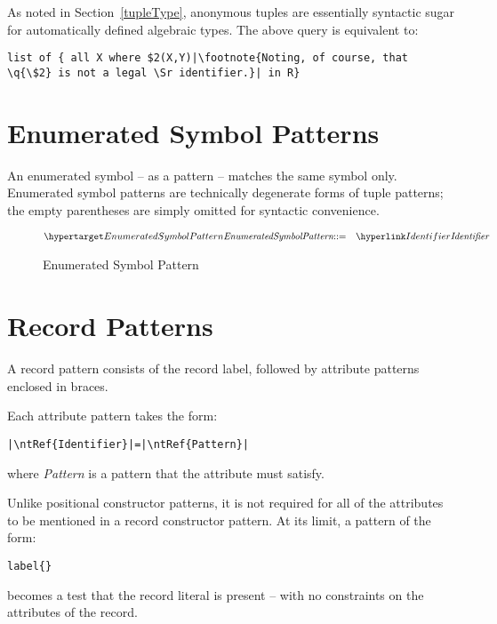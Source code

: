 \begin{aside}
As noted in Section~\vref{tupleType}, anonymous tuples are essentially syntactic sugar for automatically defined algebraic types. The above query is equivalent to:
\begin{lstlisting}[escapechar=|]
list of { all X where $2(X,Y)|\footnote{Noting, of course, that \q{\$2} is not a legal \Sr identifier.}| in R}
\end{lstlisting}

\end{aside}

\section{Enumerated Symbol Patterns}
\label{enumPattern}

An enumerated symbol -- as a pattern -- matches the same symbol only. Enumerated symbol patterns are technically degenerate forms of tuple patterns; the empty parentheses are simply omitted for syntactic convenience.

\begin{figure}[htbp]
\begin{eqnarray*}
\ntDef{EnumeratedSymbolPattern}&\arrow&\ntRef{Identifier}
\end{eqnarray*}
\caption{Enumerated Symbol Pattern}
\label{enumSumbolPtn}
\end{figure}

\section{Record Patterns}
\label{aggregateConPattern}
A record pattern consists of the record label, followed by attribute patterns enclosed in braces.

Each attribute pattern takes the form:
\begin{lstlisting}[escapechar=|]
|\ntRef{Identifier}|=|\ntRef{Pattern}|
\end{lstlisting}
where \emph{Pattern} is a pattern that the  attribute must satisfy.

Unlike positional constructor patterns, it is not required for all of the attributes to be mentioned in a record constructor pattern. At its limit, a pattern of the form:
\begin{lstlisting}
label{}
\end{lstlisting}
becomes a test that the  record literal is present -- with no constraints on the attributes of the record.

